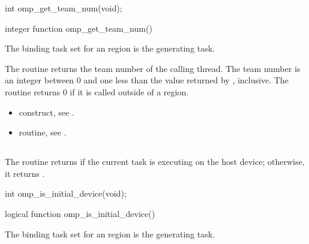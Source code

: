 \format
\ccppspecificstart
\begin{boxedcode}
int omp\_get\_team\_num(void);
\end{boxedcode}
\ccppspecificend

\fortranspecificstart
\begin{boxedcode}
integer function omp\_get\_team\_num()
\end{boxedcode}
\fortranspecificend

\binding
The binding task set for an  region is the generating task.

\effect
The  routine returns the team number of the calling thread. The 
team number is an integer between 0 and one less than the value returned by 
, inclusive. The routine returns 0 if it is called outside of a 
 region.

\crossreferences
\begin{itemize}
\item {} construct, see 
.

\item {} routine, see 
. 
\end{itemize}









\subsection{}
\label{subsec:omp_is_initial_device}
\summary
The  routine returns  if the current task is executing 
on the host device; otherwise, it returns .

\parbox{\linewidth}{%
\format
\ccppspecificstart
\begin{boxedcode}
int omp\_is\_initial\_device(void);
\end{boxedcode}
\ccppspecificend}

\fortranspecificstart
\begin{boxedcode}
logical function omp\_is\_initial\_device()
\end{boxedcode}
\fortranspecificend

\binding
The binding task set for an  region is the generating task.

